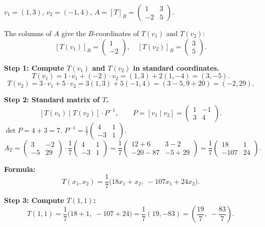 \documentclass[12pt,a3paper]{article}
\begin{document}
\begin{tcolorbox}[enhanced,breakable,
  colback=cF!4,colframe=cF,boxrule=0.8pt,arc=5pt,
  title={\textbf{Answer --- Matrix of $T$ Relative to Basis $B$; Formula for $T$ and $T(1,1)$}},
  fonttitle=\bfseries\color{white},colbacktitle=cF]

$v_1=(1,3)$, $v_2=(-1,4)$, $A=[T]_B=\begin{pmatrix}1&3\\-2&5\end{pmatrix}$.

The columns of $A$ give the $B$-coordinates of $T(v_1)$ and $T(v_2)$:
\[
[T(v_1)]_B=\begin{pmatrix}1\\-2\end{pmatrix},\quad [T(v_2)]_B=\begin{pmatrix}3\\5\end{pmatrix}.
\]

\textbf{Step 1: Compute $T(v_1)$ and $T(v_2)$ in standard coordinates.}
\[
T(v_1)=1\cdot v_1+(-2)\cdot v_2=(1,3)+2(1,-4)=(3,-5).
\]
\[
T(v_2)=3\cdot v_1+5\cdot v_2=3(1,3)+5(-1,4)=(3-5,9+20)=(-2,29).
\]

\textbf{Step 2: Standard matrix of $T$.}
\[
[T(v_1)\mid T(v_2)]\cdot P^{-1},\qquad P=[v_1\mid v_2]=\begin{pmatrix}1&-1\\3&4\end{pmatrix}.
\]
$\det P=4+3=7$.
$P^{-1}=\frac{1}{7}\begin{pmatrix}4&1\\-3&1\end{pmatrix}$.
\[
A_T=\begin{pmatrix}3&-2\\-5&29\end{pmatrix}\cdot\frac{1}{7}\begin{pmatrix}4&1\\-3&1\end{pmatrix}
=\frac{1}{7}\begin{pmatrix}12+6&3-2\\-20-87&-5+29\end{pmatrix}
=\frac{1}{7}\begin{pmatrix}18&1\\-107&24\end{pmatrix}.
\]

\textbf{Formula:}
\[
T(x_1,x_2)=\frac{1}{7}\bigl(18x_1+x_2,\;-107x_1+24x_2\bigr).
\]

\textbf{Step 3: Compute $T(1,1)$:}
\[
T(1,1)=\frac{1}{7}\bigl(18+1,\;-107+24\bigr)=\frac{1}{7}(19,-83)=\boxed{\left(\frac{19}{7},\;-\frac{83}{7}\right)}.
\]

\end{tcolorbox}
\end{document}
